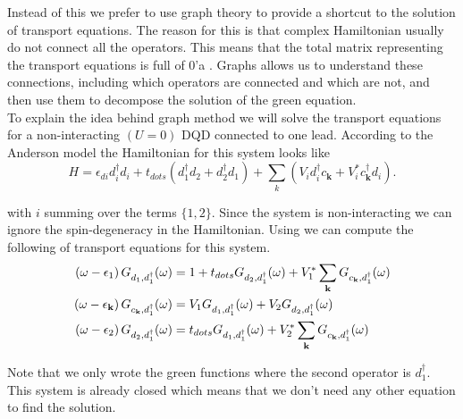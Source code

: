 Instead of this we prefer to use graph theory to provide a shortcut to the solution of transport equations. The reason for this is that complex Hamiltonian usually do not  connect all the operators. This means that the total matrix representing the transport equations is full of $0$'a . Graphs allows us to understand these connections, including which operators are connected and which are not,  and then use them to decompose the solution of the green equation.\\ 


To explain the idea behind graph method we will solve the transport equations for a non-interacting $(U=0)$ DQD connected to one lead. According to the Anderson model the Hamiltonian for this system looks like 
\begin{equation}
    H=\epsilon_{di}d_{i}^{\dagger}d_{i}+t_{dots}\left(d_{1}^{\dagger}d_{2}+d_{2}^{\dagger}d_{1}\right)+\sum_{k}\left(V_{i}d_{i}^{\dagger}c_{\mathbf{k}}+V_{i}^{*}c_{\mathbf{k}}^{\dagger}d_{i}\right).
\end{equation} 


with $i$ summing over the terms $\{1,2\}$. Since the system is non-interacting we can ignore the spin-degeneracy in the Hamiltonian. Using we can compute the following  of transport equations for this system.
\begin{align}
     \left(\omega-\epsilon_{1}\right)G_{d_{1},d_{1}^{\dagger}}(\omega)&=1+t_{dots}G_{d_{2},d_{1}^{\dagger}}(\omega)+V_{1}^{*}\sum_{\mathbf{k}}G_{c_{\mathbf{k}},d_{1}^{\dagger}}(\omega) \label{eq:green1}  \\
     \left(\omega-\epsilon_{\mathbf{k}}\right)G_{c_{\mathbf{k}},d_{1}^{\dagger}}(\omega) &= V_{1}G_{d_{1},d_{1}^{\dagger}}(\omega)+V_{2}G_{d_{2},d_{1}^{\dagger}}(\omega) \label{eq:green2} \\
     \left(\omega-\epsilon_{2}\right)G_{d_{2},d_{1}^{\dagger}}(\omega)&= t_{dots}G_{d_{1},d_{1}^{\dagger}}(\omega)+V_{2}^{*}\sum_{\mathbf{k}}G_{c_{\mathbf{k}},d_{1}^{\dagger}}(\omega) \label{eq:green3} 
\end{align}


 Note that we only wrote  the green functions where the second operator is $d_1^\dagger$. This system is already closed which means that we don't need any other equation to find the solution. 

